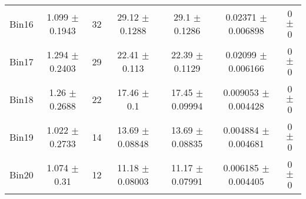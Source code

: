 \begin{tabular}{@{\extracolsep{4pt}}lcccccc@{}}
     Bin16 & 1.099 $\pm$ 0.1943 & 32 & 29.12 $\pm$ 0.1288 & 29.1 $\pm$ 0.1286 & 0.02371 $\pm$ 0.006898 & 0 $\pm$ 0 \\ 
     Bin17 & 1.294 $\pm$ 0.2403 & 29 & 22.41 $\pm$ 0.113 & 22.39 $\pm$ 0.1129 & 0.02099 $\pm$ 0.006166 & 0 $\pm$ 0 \\ 
     Bin18 & 1.26 $\pm$ 0.2688 & 22 & 17.46 $\pm$ 0.1 & 17.45 $\pm$ 0.09994 & 0.009053 $\pm$ 0.004428 & 0 $\pm$ 0 \\ 
     Bin19 & 1.022 $\pm$ 0.2733 & 14 & 13.69 $\pm$ 0.08848 & 13.69 $\pm$ 0.08835 & 0.004884 $\pm$ 0.004681 & 0 $\pm$ 0 \\ 
     Bin20 & 1.074 $\pm$ 0.31 & 12 & 11.18 $\pm$ 0.08003 & 11.17 $\pm$ 0.07991 & 0.006185 $\pm$ 0.004405 & 0 $\pm$ 0 \\ 
\hline\hline
  \end{tabular}

